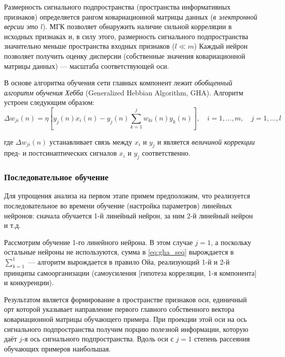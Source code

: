 \documentclass{article}
\numberwithin{equation}{subsection}
\begin{document}
Размерность сигнального подпространства (пространства информативных признаков) определяется 
рангом ковариационной матрицы данных (\textit{в электронной версии это $l$}). МГК позволяет 
обнаружить наличие сильной корреляции в исходных признаках и, в силу этого, размерность
сигнального подпространства значительно меньше пространства входных признаков ($l \ll m$)
Каждый нейрон позволяет получить оценку дисперсии (собственные значения ковариационной 
матрицы данных) --- масштаба соответствующей оси.

В основе алгоритма обучения сети главных компонент лежит \textit{обобщенный алгоритм обучения Хебба} 
(Generalized Hebbian Algorithm, GHA).
Алгоритм устроен следующим образом:
\begin{equation}
    \Delta w _{ji}(n) = \eta 
    \left[
        y_j(n) x_i(n) - y_j(n) \sum_{k=1}^j w_{ki}(n) y_k(n) 
    \right], \quad i = 1, \dots, m,\quad j=1, \dots, l
    \label{eq:gha_seq}
\end{equation}

\noindent
где $\Delta w_{ji}(n)$ устанавливает связь между $x_i$ и $y_j$ и является \textit{величиной коррекции}
пред- и постсинаптических сигналов $x_i$ и $y_j$ соответственно.




\subsubsection{Последовательное обучение}

Для упрощения анализа на первом этапе примем предположим, что реализуется последовательное
во времени обучение (настройка параметров) линейных нейронов: сначала обучается 1-й линейный нейрон,
за ним 2-й линейный нейрон и т.д.

Рассмотрим обучение 1-го линейного нейрона. В этом случае $j=1$, а поскольку остальные нейроны
не используются, сумма в \ref{eq:gha_seq} вырождается в $\sum_{k=1}^1$ --- алгоритм вырождается 
в правило Ойа, реализующий 1-й и 2-й принципы самоорганизации (самоусиления [гипотеза корреляции, 
1-я компонента] и конкуренции).

Результатом является формирование в пространстве признаков оси, единичный орт которой указывает
направление первого главного собственного вектора ковариационной матрицы обучающего примера. 
При проекции этой оси на ось сигнального подпространства получим порцию полезной информации, 
которую даёт $j$-я ось сигнального подпространства.
Вдоль оси с $j=1$ степень рассеяния обучающих примеров наибольшая.
\end{document}
